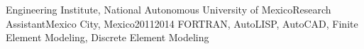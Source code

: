 {Engineering Institute, National Autonomous University of
Mexico}{Research Assistant}{Mexico City, Mexico}{2011}{2014}
{FORTRAN, AutoLISP, AutoCAD, Finite Element Modeling, Discrete Element Modeling}
{
}
